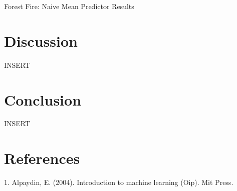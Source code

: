 \documentclass[twoside,11pt]{article}
\begin{document}
\begin{table}[h!]
	\begin{center}
		\caption{Forest Fire: Naive Mean Predictor Results}
		\label{tab:table6}
	\end{center}
\end{table}



\newpage

\section{Discussion}
INSERT\\ 

\section{Conclusion}
INSERT\\ 

\section{References}
1. Alpaydin, E. (2004). Introduction to machine learning (Oip). Mit Press. 

\newpage
\end{document}
